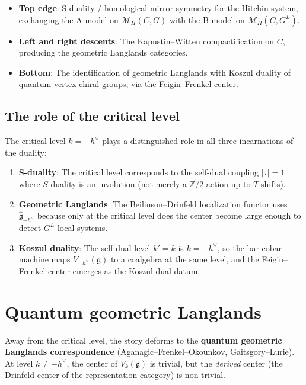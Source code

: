 \documentclass[11pt]{article}
\theoremstyle{definition}
\theoremstyle{remark}
\newcommand{\g}{\mathfrak{g}}
\newcommand{\hv}{h^\vee}
\begin{document}
\begin{itemize}
 \item \textbf{Top edge}: S-duality / homological mirror symmetry for the
 Hitchin system, exchanging the A-model on $\mathcal{M}_H(C,G)$ with the
 B-model on $\mathcal{M}_H(C,G^L)$.
 \item \textbf{Left and right descents}: The Kapustin--Witten
 compactification on $C$, producing the geometric Langlands categories.
 \item \textbf{Bottom}: The identification of geometric Langlands with Koszul
 duality of quantum vertex chiral groups, via the Feigin--Frenkel center.
\end{itemize}

\subsection{The role of the critical level}

The critical level $k = -\hv$ plays a distinguished role in all three
incarnations of the duality:

\begin{enumerate}[label=(\roman*)]
 \item \textbf{S-duality}: The critical level corresponds to the self-dual
 coupling $|\tau| = 1$ where $S$-duality is an involution (not merely a
 $\mathbb{Z}/2$-action up to $T$-shifts).
 \item \textbf{Geometric Langlands}: The Beilinson--Drinfeld localization
 functor uses $\hat{\g}_{-\hv}$ because only at the critical level does the
 center become large enough to detect $G^L$-local systems.
 \item \textbf{Koszul duality}: The self-dual level $k' = k$ is $k = -\hv$,
 so the bar-cobar machine maps $V_{-\hv}(\g)$ to a coalgebra at the
 same level, and the Feigin--Frenkel center emerges as the Koszul dual
 datum.
\end{enumerate}


\section{Quantum geometric Langlands}
\label{sec:quantum-langlands}

Away from the critical level, the story deforms to the
\textbf{quantum geometric Langlands correspondence}
(Aganagic--Frenkel--Okounkov, Gaitsgory--Lurie). At level $k \neq -\hv$, the
center of $V_k(\g)$ is trivial, but the \emph{derived} center (the
Drinfeld center of the representation category) is non-trivial.
\end{document}
